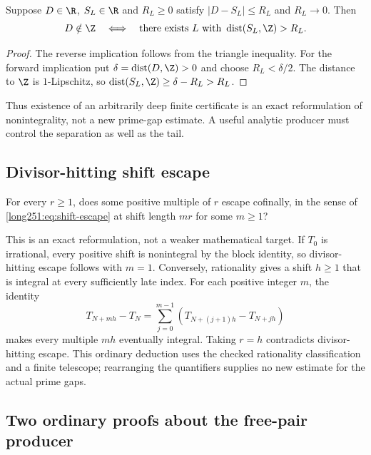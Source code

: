 \begin{proposition}\label{long251:res:complete-truncation}
Suppose $D\in\R$, $S_L\in\R$ and $R_L\ge0$ satisfy
$|D-S_L|\le R_L$ and $R_L\to0$.  Then
\[
 D\notin\Z\quad\Longleftrightarrow\quad
 \text{there exists }L\text{ with }\operatorname{dist}(S_L,\Z)>R_L.
\]
\end{proposition}
\begin{proof}
The reverse implication follows from the triangle inequality.
For the forward implication put $\delta=\operatorname{dist}(D,\Z)>0$
and choose $R_L<\delta/2$.  The distance to $\Z$ is $1$-Lipschitz, so
$\operatorname{dist}(S_L,\Z)\ge\delta-R_L>R_L$.
\end{proof}
Thus existence of an arbitrarily deep finite certificate is an exact
reformulation of nonintegrality, not a new prime-gap estimate.  A useful
analytic producer must control the separation as well as the tail.

\subsection{Divisor-hitting shift escape}\label{long251:sec:xr-divisorhit}

\begin{problem}\label{long251:xr:divisor-hit}
For every $r\ge1$, does some positive multiple of $r$ escape cofinally, in the
sense of \eqref{long251:eq:shift-escape} at shift length $mr$ for some $m\ge1$?
\end{problem}

This is an exact reformulation, not a weaker mathematical target.
If $T_0$ is irrational, every positive shift is nonintegral by the block
identity, so divisor-hitting escape follows with $m=1$.  Conversely,
rationality gives a shift $h\ge1$ that is integral at every sufficiently
late index.  For each positive integer $m$, the identity
\[
 T_{N+mh}-T_N=\sum_{j=0}^{m-1}(T_{N+(j+1)h}-T_{N+jh})
\]
makes every multiple $mh$ eventually integral.  Taking $r=h$ contradicts
divisor-hitting escape.  This ordinary deduction uses the checked
rationality classification and a finite telescope; rearranging the
quantifiers supplies no new estimate for the actual prime gaps.

\subsection{Two ordinary proofs about the free-pair producer}
\label{long251:sec:xr-compression}

